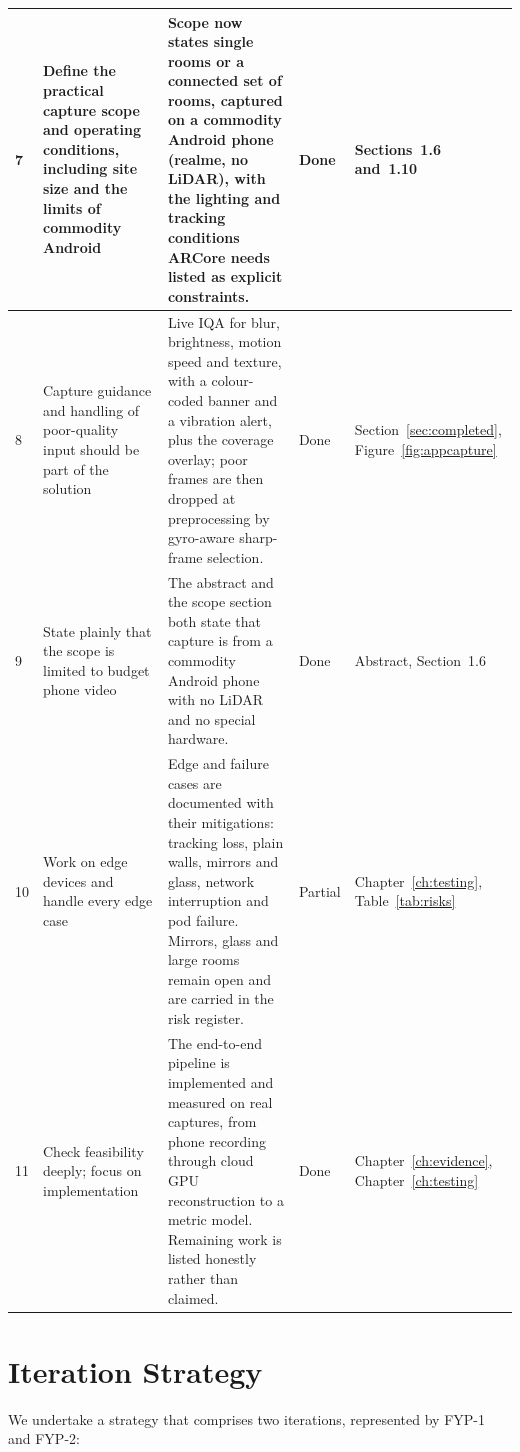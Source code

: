 {\begin{longtable}{p{}p{}p{}p{}p{}}
\midrule
7 & Define the practical capture scope and operating conditions, including site size and the limits of commodity Android & Scope now states single rooms or a connected set of rooms, captured on a commodity Android phone (realme, no LiDAR), with the lighting and tracking conditions ARCore needs listed as explicit constraints. & Done & Sections~1.6 and~1.10 \\
\midrule
8 & Capture guidance and handling of poor-quality input should be part of the solution & Live IQA for blur, brightness, motion speed and texture, with a colour-coded banner and a vibration alert, plus the coverage overlay; poor frames are then dropped at preprocessing by gyro-aware sharp-frame selection. & Done & Section~\ref{sec:completed}, Figure~\ref{fig:appcapture} \\
\midrule
9 & State plainly that the scope is limited to budget phone video & The abstract and the scope section both state that capture is from a commodity Android phone with no LiDAR and no special hardware. & Done & Abstract, Section~1.6 \\
\midrule
10 & Work on edge devices and handle every edge case & Edge and failure cases are documented with their mitigations: tracking loss, plain walls, mirrors and glass, network interruption and pod failure. Mirrors, glass and large rooms remain open and are carried in the risk register. & Partial & Chapter~\ref{ch:testing}, Table~\ref{tab:risks} \\
\midrule
11 & Check feasibility deeply; focus on implementation & The end-to-end pipeline is implemented and measured on real captures, from phone recording through cloud GPU reconstruction to a metric model. Remaining work is listed honestly rather than claimed. & Done & Chapter~\ref{ch:evidence}, Chapter~\ref{ch:testing} \\
\bottomrule
\end{longtable}
}
\section{Iteration Strategy}
We undertake a strategy that comprises two iterations, represented by FYP-1 and FYP-2:

